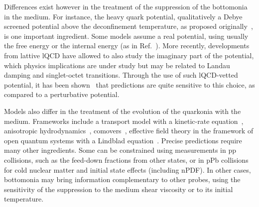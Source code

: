 \documentclass[../report.tex]{subfiles}
\begin{document}
Differences exist however in the treatment of the suppression of the bottomonia in the medium.
For instance, the heavy quark potential, qualitatively a Debye screened potential above the deconfinement temperature, as proposed originally~\cite{Matsui:1986dk}, is one important
ingredient. Some models assume a real potential, using usually the free energy or the internal energy (as in Ref.~\cite{Du:2017qkv}). More recently, developments from lattive lQCD
have allowed to also study the imaginary part of the potential, which physics implications are under study but may be related to Landau damping and singlet-octet transitions. Through the 
use of such lQCD-vetted potential, it has been shown~\cite{Krouppa:2017jlg} that predictions are quite sensitive to this choice, as compared to a perturbative potential. 

Models also differ in the treatment of the evolution of the quarkonia with the medium. Frameworks include a transport model with a kinetic-rate equation~\cite{Du:2017qkv},
anisotropic hydrodynamics~\cite{Krouppa:2017jlg}, comovers~\cite{Ferreiro:2018wbd}, effective field theory in the framework of open quantum systems with 
a Lindblad equation~\cite{Brambilla:2017zei}. Precise predictions require many other ingredients. Some can be constrained using measurements in pp collisions, such as
the feed-down fractions from other states, or in pPb collisions for cold nuclear matter and initial state effects (including nPDF). In other cases, bottomonia may bring information
complementary to other probes, using the sensitivity of the suppression to the medium shear viscosity or to its initial temperature.
\end{document}
